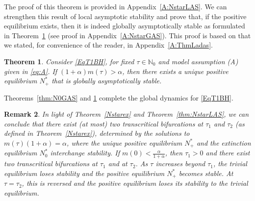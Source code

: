 \documentclass{article}
\newtheorem{theorem}{Theorem}
\numberwithin{theorem}{section}
\newtheorem{remark}[theorem]{Remark}
\begin{document}
{The proof of this theorem is provided in Appendix~\ref{A:NstarLAS}. We can strengthen this result of local asymptotic stability and prove that, if the positive equilibrium exists, then it is indeed globally asymptotically stable as formulated in Theorem~\ref{thm:NstarGAS} (see proof  in Appendix~\ref{A:NstarGAS}). This proof is based on \cite[Theorem~1.15]{Ladas_2004} that we stated, for convenience of the reader, in Appendix~\ref{A:ThmLadas}. 

\begin{theorem}\label{thm:NstarGAS}
    Consider \eqref{EqT1BH}, for fixed $\tau\in \mathbb{N}_0$   and model assumption (A) given in \eqref{eq:A}.    
 If $(1+\alpha)m(\tau)>\alpha$, then there exists a unique positive equilibrium $N^*_+$ that is globally asymptotically stable. 
\end{theorem}

Theorems~\ref{thm:N0GAS} and \ref{thm:NstarGAS} complete the global dynamics for \eqref{EqT1BH}.













\begin{remark}
In light of Theorem~\ref{Nstarex} and Theorem~\ref{thm:NstarLAS}, we can conclude that there exist (at most) two transcritical bifurcations at $\tau_1$ and $\tau_2$ (as defined in Theorem~\ref{Nstarex}), determined by the solutions to $m(\tau)(1+\alpha)=\alpha$, where the  unique positive equilibrium $N^*_+$ and the extinction equilibrium $N^*_0$ interchange stability. If $m(0)<\frac{\alpha}{1+\alpha}$, then $\tau_1>0$ and there exist two transcritical bifurcations at $\tau_1$ and at $\tau_2$. As $\tau$ increases beyond $\tau_1$, the trivial equilibrium loses stability and the positive equilibrium $N^*_+$ becomes stable. At $\tau=\tau_2$, this is reversed and the positive equilibrium loses its stability to the trivial equilibrium. 
\end{remark}

}
\end{document}
